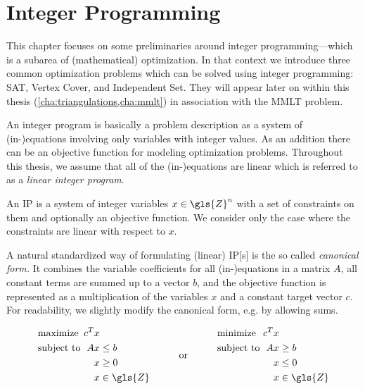 \chapter{Integer Programming}
This chapter focuses on some preliminaries around integer
programming---which is a subarea of (mathematical) optimization.
In that context we introduce three common optimization problems which
can be solved using integer programming: SAT, Vertex Cover, and
Independent Set. They will appear later on within this thesis
(\cref{cha:triangulations,cha:mmlt}) in association with the
\gls{MMLT} problem.

An integer program is basically a problem description as a system
of (in-)equations involving only variables with integer values. As
an addition there can be an objective function for modeling
optimization problems. Throughout this thesis, we assume that all
of the (in-)equations are linear which is referred to as a
\emph{linear integer program}.

\begin{definition}
  An \gls{IP} is a system of integer variables
  \(x \in \gls{Z}^n\) with a set of constraints on them and optionally
  an objective function. We consider only the case where the 
  constraints are linear with respect to \(x\).
\end{definition}

A natural standardized way of formulating (linear) \gls{IP}[s] is the 
so called \emph{canonical form.} It combines the variable coefficients
for all (in-)equations in a matrix \(A\), all constant terms are
summed up to a vector \(b\), and the objective function is represented
as a multiplication of the variables \(x\) and a constant target
vector \(c\). For readability, we slightly modify the canonical form,
e.g. by allowing sums.

\begin{problem}
  \[
  \begin{array}{lll}
    \begin{alignedat}{2}
      &\text{maximize } & c^Tx \\
      &\text{subject to } & Ax &\leq b \\
      && x &\geq 0 \\
      && x &\in \gls{Z}
    \end{alignedat}
    & \text{\hspace{2em}or\hspace{2em}} &
    \begin{alignedat}{2}
      &\text{minimize } & c^Tx \\
      &\text{subject to } & Ax &\geq b \\
      && x &\leq 0 \\
      && x &\in \gls{Z}
    \end{alignedat}
  \end{array}
  \]
\end{problem}

